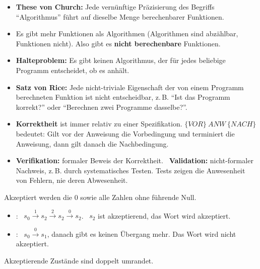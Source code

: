 \begin{merke}
\begin{itemize}[itemsep=0.1em]
\item \textbf{These von Church:} Jede vernünftige Präzisierung des Begriffs \enquote{Algorithmus} führt auf dieselbe Menge berechenbarer Funktionen.
\item Es gibt mehr Funktionen als Algorithmen (Algorithmen sind abzählbar, Funktionen nicht). Also gibt es \textbf{nicht berechenbare} Funktionen.
\item \textbf{Halteproblem:} Es gibt keinen Algorithmus, der für jedes beliebige Programm entscheidet, ob es anhält.
\item \textbf{Satz von Rice:} Jede nicht-triviale Eigenschaft der von einem Programm berechneten Funktion ist nicht entscheidbar, z.\,B. \enquote{Ist das Programm korrekt?} oder \enquote{Berechnen zwei Programme dasselbe?}.
\item \textbf{Korrektheit} ist immer relativ zu einer Spezifikation. $\{\mathit{VOR}\}\ \mathit{ANW}\ \{\mathit{NACH}\}$ bedeutet: Gilt vor der Anweisung die Vorbedingung und terminiert die Anweisung, dann gilt danach die Nachbedingung.
\item \textbf{Verifikation:} formaler Beweis der Korrektheit. \ \textbf{Validation:} nicht-formaler Nachweis, z.\,B. durch systematisches Testen. Tests zeigen die Anwesenheit von Fehlern, nie deren Abwesenheit.
\end{itemize}
\end{merke}

\beispiele
{}
Akzeptiert werden die 0 sowie alle Zahlen ohne führende Null.

\noindent\begin{minipage}[c]{0.48\linewidth}
\centering
{}
\end{minipage}\hfill
\begin{minipage}[c]{0.5\linewidth}
\begin{itemize}[itemsep=0.1em]
\item {}: \ $s_0 \xrightarrow{1} s_2 \xrightarrow{2} s_2 \xrightarrow{0} s_2$. \ $s_2$ ist akzeptierend, das Wort wird akzeptiert.
\item {}: \ $s_0 \xrightarrow{0} s_1$, danach gibt es keinen Übergang mehr. Das Wort wird nicht akzeptiert.
\end{itemize}
Akzeptierende Zustände sind doppelt umrandet.
\end{minipage}

